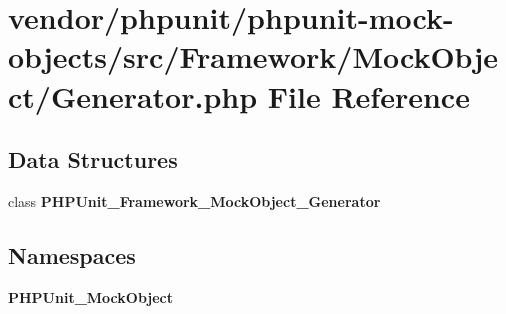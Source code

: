 \section{vendor/phpunit/phpunit-\/mock-\/objects/src/\+Framework/\+Mock\+Object/\+Generator.php File Reference}
\label{_generator_8php}
\subsection*{Data Structures}
\begin{DoxyCompactItemize}
\item 
class {\bf P\+H\+P\+Unit\+\_\+\+Framework\+\_\+\+Mock\+Object\+\_\+\+Generator}
\end{DoxyCompactItemize}
\subsection*{Namespaces}
\begin{DoxyCompactItemize}
\item 
 {\bf P\+H\+P\+Unit\+\_\+\+Mock\+Object}
\end{DoxyCompactItemize}
